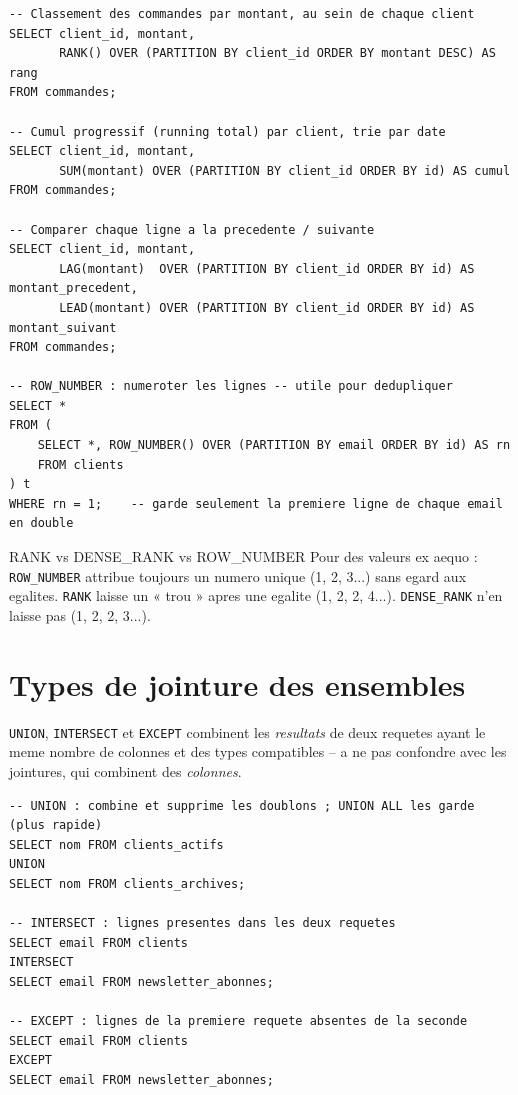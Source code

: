 \documentclass[11pt,a4paper]{article}
\begin{document}
\begin{lstlisting}
-- Classement des commandes par montant, au sein de chaque client
SELECT client_id, montant,
       RANK() OVER (PARTITION BY client_id ORDER BY montant DESC) AS rang
FROM commandes;

-- Cumul progressif (running total) par client, trie par date
SELECT client_id, montant,
       SUM(montant) OVER (PARTITION BY client_id ORDER BY id) AS cumul
FROM commandes;

-- Comparer chaque ligne a la precedente / suivante
SELECT client_id, montant,
       LAG(montant)  OVER (PARTITION BY client_id ORDER BY id) AS montant_precedent,
       LEAD(montant) OVER (PARTITION BY client_id ORDER BY id) AS montant_suivant
FROM commandes;

-- ROW_NUMBER : numeroter les lignes -- utile pour dedupliquer
SELECT *
FROM (
    SELECT *, ROW_NUMBER() OVER (PARTITION BY email ORDER BY id) AS rn
    FROM clients
) t
WHERE rn = 1;    -- garde seulement la premiere ligne de chaque email en double
\end{lstlisting}

\begin{infobox}{RANK vs DENSE\_RANK vs ROW\_NUMBER}
Pour des valeurs ex aequo : \texttt{ROW\_NUMBER} attribue toujours un numero
unique (1, 2, 3...) sans egard aux egalites. \texttt{RANK} laisse un « trou »
apres une egalite (1, 2, 2, 4...). \texttt{DENSE\_RANK} n'en laisse pas (1, 2,
2, 3...).
\end{infobox}

\section{Types de jointure des ensembles}
\texttt{UNION}, \texttt{INTERSECT} et \texttt{EXCEPT} combinent les
\emph{resultats} de deux requetes ayant le meme nombre de colonnes et des
types compatibles -- a ne pas confondre avec les jointures, qui combinent des
\emph{colonnes}.

\begin{lstlisting}
-- UNION : combine et supprime les doublons ; UNION ALL les garde (plus rapide)
SELECT nom FROM clients_actifs
UNION
SELECT nom FROM clients_archives;

-- INTERSECT : lignes presentes dans les deux requetes
SELECT email FROM clients
INTERSECT
SELECT email FROM newsletter_abonnes;

-- EXCEPT : lignes de la premiere requete absentes de la seconde
SELECT email FROM clients
EXCEPT
SELECT email FROM newsletter_abonnes;
\end{lstlisting}
\end{document}
